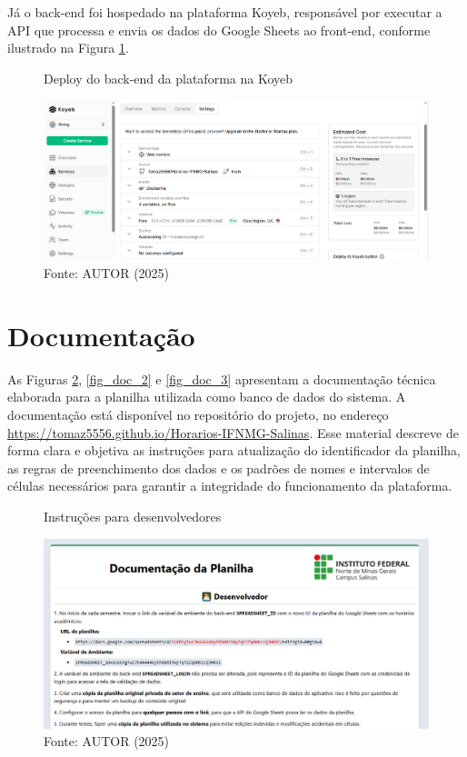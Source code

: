 Já o back-end foi hospedado na plataforma Koyeb, responsável por executar a API que processa e envia os dados do Google Sheets ao front-end, conforme ilustrado na Figura \ref{fig_deploy_2}.

\begin{figure}[htb]
    \centering
    \caption{Deploy do back-end da plataforma na Koyeb}
    \includegraphics[width=1\textwidth]{Figuras/deploy-2.png}
    \caption*{Fonte: AUTOR (2025)}
    \label{fig_deploy_2}
\end{figure}

\section{Documentação}

As Figuras \ref{fig_doc_1}, \ref{fig_doc_2} e \ref{fig_doc_3} apresentam a documentação técnica elaborada para a planilha utilizada como banco de dados do sistema. A documentação está disponível no repositório do projeto, no endereço \url{https://tomaz5556.github.io/Horarios-IFNMG-Salinas}. Esse material descreve de forma clara e objetiva as instruções para atualização do identificador da planilha, as regras de preenchimento dos dados e os padrões de nomes e intervalos de células necessários para garantir a integridade do funcionamento da plataforma.

\begin{figure}[H]
    \centering
    \caption{Instruções para desenvolvedores}
    \includegraphics[width=1\textwidth]{Figuras/doc-1.png}
    \caption*{Fonte: AUTOR (2025)}
    \label{fig_doc_1}
\end{figure}

